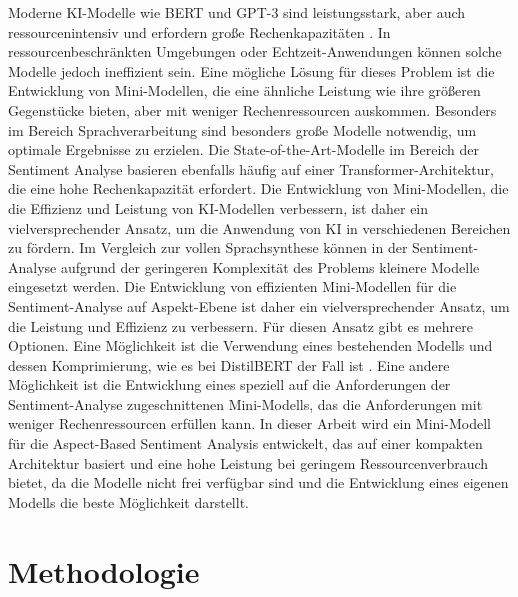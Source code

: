 \documentclass[12pt]{article}
\begin{document}
Moderne KI-Modelle wie BERT und GPT-3 sind leistungsstark, aber auch ressourcenintensiv und erfordern große Rechenkapazitäten \cite{brown2020language}. In ressourcenbeschränkten 
Umgebungen oder Echtzeit-Anwendungen können solche Modelle jedoch ineffizient sein. Eine mögliche Lösung für dieses Problem ist die Entwicklung von 
Mini-Modellen, die eine ähnliche Leistung wie ihre größeren Gegenstücke bieten, aber mit weniger Rechenressourcen auskommen.
\newline
\newline
Besonders im Bereich Sprachverarbeitung sind besonders große Modelle notwendig, um optimale Ergebnisse zu erzielen.
Die State-of-the-Art-Modelle im Bereich der Sentiment Analyse basieren ebenfalls häufig auf einer Transformer-Architektur, die eine hohe Rechenkapazität erfordert. Die Entwicklung von Mini-Modellen, 
die die Effizienz und Leistung von KI-Modellen verbessern, ist daher ein vielversprechender Ansatz, um die Anwendung von KI in verschiedenen Bereichen 
zu fördern. 
\newline
\newline
Im Vergleich zur vollen Sprachsynthese können in der Sentiment-Analyse aufgrund der geringeren Komplexität des Problems kleinere Modelle eingesetzt werden. 
Die Entwicklung von effizienten Mini-Modellen für die Sentiment-Analyse auf Aspekt-Ebene ist daher ein vielversprechender Ansatz,
um die Leistung und Effizienz zu verbessern.
\newline
\newline
Für diesen Ansatz gibt es mehrere Optionen. Eine Möglichkeit ist die Verwendung eines bestehenden Modells und dessen Komprimierung, wie es bei DistilBERT der Fall ist \cite{sanh2019distilbert}.
Eine andere Möglichkeit ist die Entwicklung eines speziell auf die Anforderungen der Sentiment-Analyse zugeschnittenen Mini-Modells, das die Anforderungen mit weniger Rechenressourcen erfüllen kann.
In dieser Arbeit wird ein Mini-Modell für die Aspect-Based Sentiment Analysis entwickelt, das auf einer kompakten Architektur basiert und eine hohe Leistung bei geringem Ressourcenverbrauch bietet, da die Modelle nicht frei verfügbar sind und die Entwicklung eines eigenen Modells die beste Möglichkeit darstellt.

\section{Methodologie}
\end{document}
